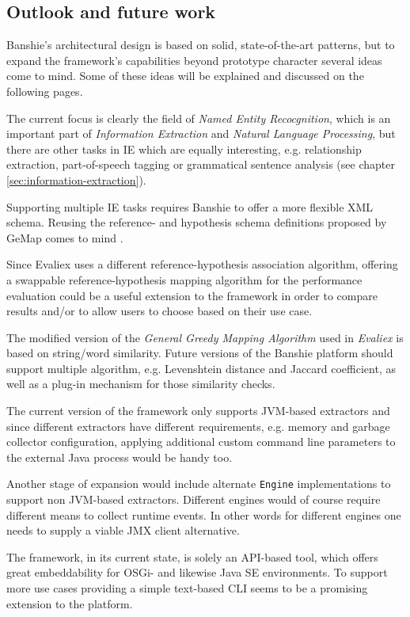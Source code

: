 \subsection{Outlook and future work}
Banshie's architectural design is based on solid, state-of-the-art patterns, but to expand the framework's capabilities beyond prototype character several ideas come to mind. Some of these ideas will be explained and discussed on the following pages.

The current focus is clearly the field of \textit{Named Entity Recocgnition}, which is an important part of \textit{Information Extraction} and \textit{Natural Language Processing}, but there are other tasks in \gls{IE} which are equally interesting, e.g. relationship extraction, part-of-speech tagging or grammatical sentence analysis (see chapter \ref{sec:information-extraction}).

Supporting multiple \gls{IE} tasks requires Banshie to offer a more flexible XML schema. Reusing the reference- and hypothesis schema definitions proposed by GeMap comes to mind \cite{Linsmayr:2010b}.

Since Evaliex uses a different reference-hypothesis association algorithm, offering a swappable reference-hypothesis mapping algorithm for the performance evaluation could be a useful extension to the framework in order to compare results and/or to allow users to choose based on their use case.

The modified version of the \textit{General Greedy Mapping Algorithm} used in \textit{Evaliex} is based on string/word similarity. Future versions of the Banshie platform should support multiple algorithm, e.g. Levenshtein distance and Jaccard coefficient, as well as a plug-in mechanism for those similarity checks.

The current version of the framework only supports \gls{JVM}-based extractors and since different extractors have different requirements, e.g. memory and garbage collector configuration, applying additional custom command line parameters to the external Java process would be handy too.

Another stage of expansion would include alternate \texttt{Engine} implementations to support non \gls{JVM}-based extractors. Different engines would of course require different means to collect runtime events. In other words for different engines one needs to supply a viable \gls{JMX} client alternative.

The framework, in its current state, is solely an \gls{API}-based tool, which offers great embeddability for \gls{OSGi}- and likewise Java SE environments. To support more use cases providing a simple text-based \gls{CLI} seems to be a promising extension to the platform.

